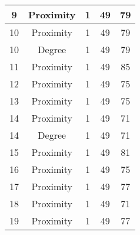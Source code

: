 \documentclass[results.tex]{subfiles}
\begin{document}
\begin{center}
\begin{tabular}{| c || c | c | c | c |}
            \hline
            9                       & Proximity                    & 1                      & 49                      & 79                   \\
            \hline
            10                      & Proximity                    & 1                      & 49                      & 79                   \\
            \hline
            10                      & Degree                       & 1                      & 49                      & 79                   \\
            \hline
            11                      & Proximity                    & 1                      & 49                      & 85                   \\
            \hline
            12                      & Proximity                    & 1                      & 49                      & 75                   \\
            \hline
            13                      & Proximity                    & 1                      & 49                      & 75                   \\
            \hline
            14                      & Proximity                    & 1                      & 49                      & 71                   \\
            \hline
            14                      & Degree                       & 1                      & 49                      & 71                   \\
            \hline
            15                      & Proximity                    & 1                      & 49                      & 81                   \\
            \hline
            16                      & Proximity                    & 1                      & 49                      & 75                   \\
            \hline
            17                      & Proximity                    & 1                      & 49                      & 77                   \\
            \hline
            18                      & Proximity                    & 1                      & 49                      & 71                   \\
            \hline
            19                      & Proximity                    & 1                      & 49                      & 77                   \\

\end{tabular}
\end{center}
\end{document}
